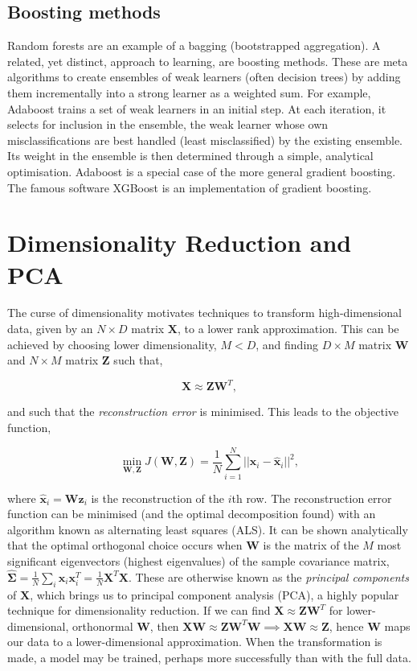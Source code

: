 \documentclass[11pt]{amsart}
\begin{document}
\subsection{Boosting methods}

Random forests are an example of a bagging (bootstrapped aggregation). A related, yet distinct, approach to learning, are boosting methods. These are meta algorithms to create ensembles of weak learners (often decision trees) by adding them incrementally into a strong learner as a weighted sum. For example, Adaboost trains a set of weak learners in an initial step. At each iteration, it selects for inclusion in the ensemble, the weak learner whose own misclassifications are best handled (least misclassified) by the existing ensemble. Its weight in the ensemble is then determined through a simple, analytical optimisation. Adaboost is a special case of the more general gradient boosting. The famous software XGBoost is an implementation of gradient boosting.

\section{Dimensionality Reduction and PCA}

The curse of dimensionality motivates techniques to transform high-dimensional data, given by an $N \times D$ matrix $\mathbf{X}$, to a lower rank approximation. This can be achieved by choosing lower dimensionality, $M  < D$, and finding $D \times M$ matrix $\mathbf{W}$ and $N \times M$ matrix $\mathbf{Z}$ such that,

$$\mathbf{X} \approx \mathbf{Z}\mathbf{W}^T,$$

and such that the \emph{reconstruction error} is minimised. This leads to the objective function,

$$\min_{\mathbf{W}, \mathbf{Z}} J(\mathbf{W}, \mathbf{Z}) = \frac{1}{N}\sum_{i=1}^N||\mathbf{x}_i - \hat{\mathbf{x}}_i||^2,$$

where $\hat{\mathbf{x}}_i = \mathbf{W}\mathbf{z}_i$ is the reconstruction of the $i$th row. The reconstruction error function can be minimised (and the optimal decomposition found) with an algorithm known as alternating least squares (ALS). It can be shown analytically that the optimal orthogonal choice occurs when $\mathbf{W}$ is the matrix of the $M$ most significant eigenvectors (highest eigenvalues) of the sample covariance matrix, $\hat{\boldsymbol\Sigma} = \frac{1}{N}\sum_i\mathbf{x}_i\mathbf{x}_i^T = \frac{1}{N}\mathbf{X}^T\mathbf{X}$. These are otherwise known as the \emph{principal components} of $\mathbf{X}$, which brings us to principal component analysis (PCA), a highly popular technique for dimensionality reduction. If we can find $\mathbf{X} \approx \mathbf{Z}\mathbf{W}^T$ for lower-dimensional, orthonormal $\mathbf{W}$, then $\mathbf{X}\mathbf{W} \approx \mathbf{Z}\mathbf{W}^T\mathbf{W} \implies \mathbf{X}\mathbf{W} \approx \mathbf{Z}$, hence $\mathbf{W}$ maps our data to a lower-dimensional approximation. When the transformation is made, a model may be trained, perhaps more successfully than with the full data.
\end{document}
